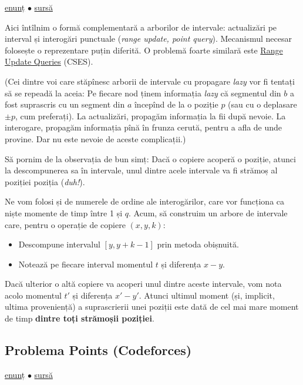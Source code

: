 \href{https://codeforces.com/contest/292/problem/E}{enunț}
$\bullet$
\hyperref[code:copying-data]{sursă}

Aici întîlnim o formă complementară a arborilor de intervale: actualizări pe interval și interogări punctuale (\textit{range update, point query}). Mecanismul necesar folosește o reprezentare puțin diferită. O problemă foarte similară este \href{https://cses.fi/problemset/task/1651}{Range Update Queries} (CSES).

(Cei dintre voi care stăpînesc arborii de intervale cu propagare \textit{lazy} vor fi tentați să se repeadă la aceia: Pe fiecare nod ținem informația \textit{lazy} că segmentul din $b$ a fost suprascris cu un segment din $a$ începînd de la o poziție $p$ (sau cu o deplasare $\pm p$, cum preferați). La actualizări, propagăm informația la fii după nevoie. La interogare, propagăm informația pînă în frunza cerută, pentru a afla de unde provine. Dar nu este nevoie de aceste complicații.)

Să pornim de la observația de bun simț: Dacă o copiere acoperă o poziție, atunci la descompunerea sa în intervale, unul dintre acele intervale va fi strămoș al poziției poziția (\textit{duh!}).

Ne vom folosi și de numerele de ordine ale interogărilor, care vor funcționa ca niște momente de timp între 1 și $q$. Acum, să construim un arbore de intervale care, pentru o operație de copiere $(x, y, k)$:

\begin{itemize}
  \item Descompune intervalul $[y, y + k - 1]$ prin metoda obișnuită.
  \item Notează pe fiecare interval momentul $t$ și diferența $x-y$.
\end{itemize}

Dacă ulterior o altă copiere va acoperi unul dintre aceste intervale, vom nota acolo momentul $t'$ și diferența $x'-y'$. Atunci ultimul moment (și, implicit, ultima proveniență) a suprascrierii unei poziții este dată de cel mai mare moment de timp \textbf{dintre toți strămoșii poziției}.

\subsection{Problema Points (Codeforces)}
\label{problem:points}

\href{https://codeforces.com/contest/19/problem/D}{enunț}
$\bullet$
\hyperref[code:points]{sursă}

